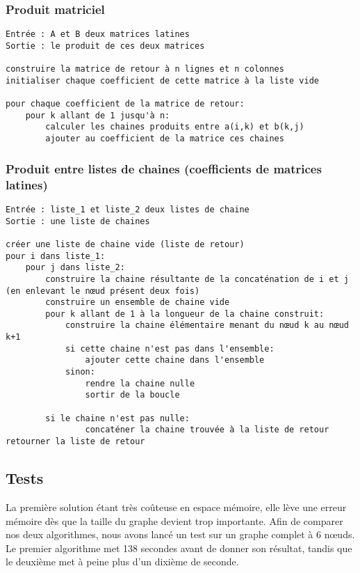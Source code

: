 \documentclass{scrartcl}
\begin{document}
    \subsubsection{Produit matriciel}
      \begin{lstlisting}
Entrée : A et B deux matrices latines
Sortie : le produit de ces deux matrices

construire la matrice de retour à n lignes et n colonnes
initialiser chaque coefficient de cette matrice à la liste vide

pour chaque coefficient de la matrice de retour:
    pour k allant de 1 jusqu'à n:
        calculer les chaines produits entre a(i,k) et b(k,j)
        ajouter au coefficient de la matrice ces chaines 
      \end{lstlisting}

    \subsubsection{Produit entre listes de chaines (coefficients de matrices
    latines)}
      \begin{lstlisting}
Entrée : liste_1 et liste_2 deux listes de chaine 
Sortie : une liste de chaines 

créer une liste de chaine vide (liste de retour)
pour i dans liste_1:
    pour j dans liste_2:
        construire la chaine résultante de la concaténation de i et j (en enlevant le nœud présent deux fois)
        construire un ensemble de chaine vide
        pour k allant de 1 à la longueur de la chaine construit:
            construire la chaine élémentaire menant du nœud k au nœud k+1
            si cette chaine n'est pas dans l'ensemble:
                ajouter cette chaine dans l'ensemble
            sinon:
                rendre la chaine nulle
                sortir de la boucle

        si le chaine n'est pas nulle:
                concaténer la chaine trouvée à la liste de retour
retourner la liste de retour
			\end{lstlisting}

  \subsection{Tests}
    La première solution étant très coûteuse en espace mémoire, elle lève une
    erreur mémoire dès que la taille du graphe devient trop importante.
    Afin de comparer nos deux algorithmes, nous avons lancé un test sur un
    graphe complet à 6 nœuds. Le premier algorithme met 138 secondes avant de
    donner son résultat, tandis que le deuxième met à peine plus d'un dixième
    de seconde.
\end{document}
